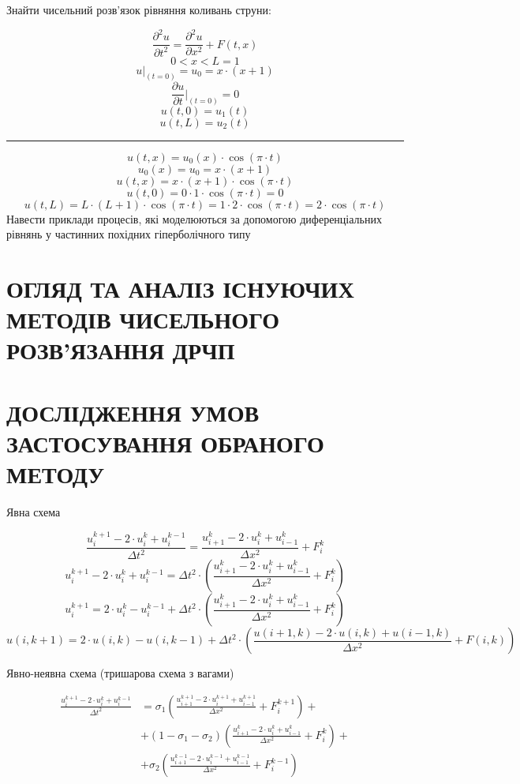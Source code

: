 \documentclass{article}
\begin{document}
    Знайти чисельний розв’язок рівняння коливань струни:

    $$ \frac{\partial^2{u}}{\partial{t^2}} = \frac{\partial^2{u}}{\partial{x^2}} + F(t, x) $$
    $$ 0 < x < L = 1 $$
    $$ u \vert_{(t = 0)} = u_0 = x \cdot (x+1) $$
    $$ \frac{\partial{u}}{\partial{t}} \vert_{(t = 0)} = 0 $$
    $$ u(t, 0) = u_1(t) $$
    $$ u(t, L) = u_2(t) $$
    \hrule
    $$ u(t,x) = u_0(x) \cdot \cos(\pi \cdot t) $$
    $$ u_0(x) = u_0 = x \cdot (x+1) $$
    $$ u(t,x) = x \cdot (x+1) \cdot \cos(\pi \cdot t) $$
    $$ u(t,0) = 0 \cdot 1 \cdot \cos(\pi \cdot t) = 0 $$
    $$ u(t, L) = L \cdot (L+1) \cdot \cos(\pi \cdot t) = 1 \cdot 2 \cdot \cos(\pi \cdot t) = 2 \cdot \cos(\pi \cdot t) $$
    Навести приклади процесів, які моделюються за допомогою диференціальних рівнянь у частинних похідних гіперболічного типу
    
    \newpage
    \section{ОГЛЯД ТА АНАЛІЗ ІСНУЮЧИХ МЕТОДІВ ЧИСЕЛЬНОГО РОЗВ’ЯЗАННЯ ДРЧП}
    \newpage
    \section{ДОСЛІДЖЕННЯ УМОВ ЗАСТОСУВАННЯ ОБРАНОГО МЕТОДУ}

        Явна схема

        $$ \frac{u_i^{k+1} - 2 \cdot u_i^{k} + u_i^{k-1}}{\Delta{t}^2} = \frac{u_{i+1}^{k} - 2 \cdot u_i^{k} + u_{i-1}^{k}}{\Delta{x}^2} + F_i^{k} $$
        $$ u_i^{k+1} - 2 \cdot u_i^{k} + u_i^{k-1} = \Delta{t}^2 \cdot \left( \frac{u_{i+1}^{k} - 2 \cdot u_i^{k} + u_{i-1}^{k}}{\Delta{x}^2} + F_i^{k} \right) $$
        $$ u_i^{k+1} = 2 \cdot u_i^{k} - u_i^{k-1} + \Delta{t}^2 \cdot \left( \frac{u_{i+1}^{k} - 2 \cdot u_i^{k} + u_{i-1}^{k}}{\Delta{x}^2} + F_i^{k} \right) $$
        $$ u(i, k+1) = 2 \cdot u(i, k) - u(i, k-1) + \Delta{t}^2 \cdot \left( \frac{u(i+1, k) - 2 \cdot u(i, k) + u(i-1, k)}{\Delta{x}^2} + F(i, k) \right) $$

        Явно-неявна схема (тришарова схема з вагами)

        \begin{equation*}
            \begin{split}
                \frac{u_i^{k+1} - 2 \cdot u_i^{k} + u_i^{k-1}}{\Delta{t}^2} & = \sigma_1 \left( \frac{u_{i+1}^{k+1} - 2 \cdot u_i^{k+1} + u_{i-1}^{k+1}}{\Delta{x}^2} + F_i^{k+1} \right) +\\
                & + (1 - \sigma_1 - \sigma_2) \left( \frac{u_{i+1}^{k} - 2 \cdot u_i^{k} + u_{i-1}^{k}}{\Delta{x}^2} + F_i^{k} \right) +\\
                & + \sigma_2 \left( \frac{u_{i+1}^{k-1} - 2 \cdot u_i^{k-1} + u_{i-1}^{k-1}}{\Delta{x}^2} + F_i^{k-1} \right)\\
            \end{split}
        \end{equation*}
\end{document}
